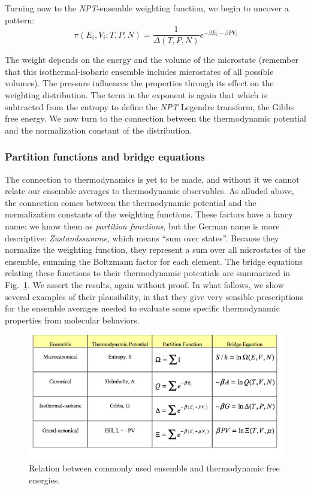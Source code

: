 \documentclass[]{article}
\begin{document}
Turning now to the \emph{NPT}-ensemble weighting function, we begin to uncover
a pattern:
\[\pi ({E_i},{V_i};T,P,N) = \frac{1}{{\Delta (T,P,N)}}{e^{ - \beta {E_i} - \beta P{V_i}}}\]

The weight depends on the energy and the volume of the microstate
(remember that this isothermal-isobaric ensemble includes microstates of
all possible volumes). The pressure influences the properties through
its effect on the weighting distribution. The term in the exponent is
again that which is subtracted from the entropy to define the \emph{NPT}
Legendre transform, the Gibbs free energy. We now turn to the connection
between the thermodynamic potential and the normalization constant of
the distribution.

\subsubsection{Partition functions and bridge
equations}\label{partition-functions-and-bridge-equations}

The connection to thermodynamics is yet to be made, and without it we
cannot relate our ensemble averages to thermodynamic observables. As
alluded above, the connection comes between the thermodynamic potential
and the normalization constants of the weighting functions. These
factors have a fancy name: we know them as \emph{partition functions},
but the German name is more descriptive: \emph{Zustandssumme}, which means
``sum over states''. Because they normalize the weighting function, they
represent a sum over all microstates of the ensemble, summing the
Boltzmann factor for each element. The bridge equations relating these
functions to their thermodynamic potentials are summarized in
Fig.~\ref{fig:bridgeEqns}. We assert the results, again without proof. In what follows, we
show several examples of their plausibility, in that they give very
sensible prescriptions for the ensemble averages needed to evaluate some
specific thermodynamic properties from molecular behaviors.

\begin{figure}
\includegraphics[width=\textwidth]{StatMech_figures/image011}
\caption{\label{fig:bridgeEqns}Relation between commonly used ensemble and thermodynamic free energies.}
\end{figure}
\end{document}
